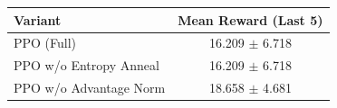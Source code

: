 \begin{tabular}{lc}
\toprule
Variant & Mean Reward (Last 5) \\
\midrule
PPO (Full) & 16.209 $\pm$ 6.718 \\
PPO w/o Entropy Anneal & 16.209 $\pm$ 6.718 \\
PPO w/o Advantage Norm & 18.658 $\pm$ 4.681 \\
\bottomrule
\end{tabular}
